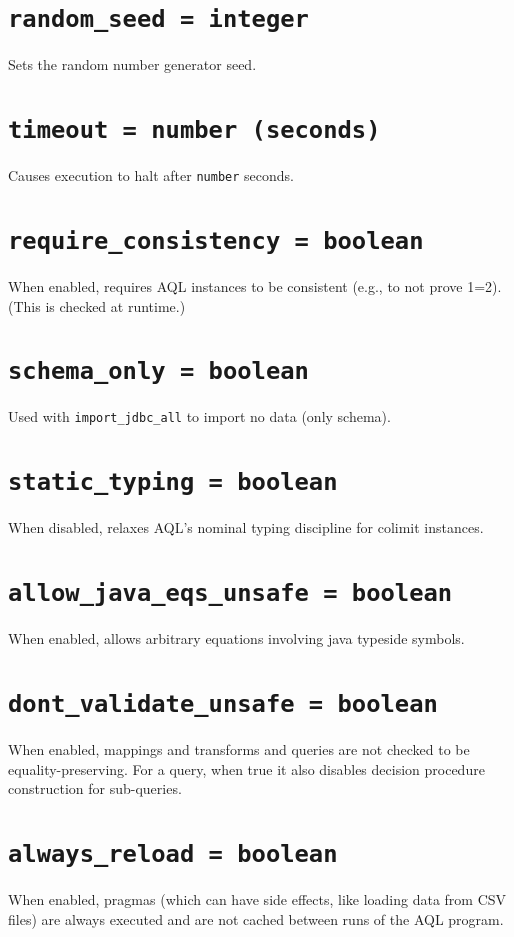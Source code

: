 \documentclass[10pt]{book}
\begin{document}
\section{{\tt random\_seed = integer}}
Sets the random number generator seed.

\section{{\tt timeout = number (seconds)}}
Causes execution to halt after {\tt number} seconds.

\section{{\tt require\_consistency = boolean}}
When enabled, requires AQL instances to be consistent (e.g., to not prove 1=2).  (This is checked at runtime.)

\section{{\tt schema\_only = boolean}}

Used with {\tt import\_jdbc\_all} to import no data (only schema).

\section{{\tt static\_typing = boolean}}
When disabled, relaxes AQL's nominal typing discipline for colimit instances.

\section{{\tt allow\_java\_eqs\_unsafe = boolean}}
When enabled, allows arbitrary equations involving java typeside symbols.

\section{{\tt dont\_validate\_unsafe = boolean}}
When enabled, mappings and transforms and queries are not checked to be equality-preserving.  For a query, when true it also disables decision procedure construction for sub-queries.

\section{{\tt always\_reload = boolean}}
When enabled, pragmas (which can have side effects, like loading data from CSV files) are always executed and are not cached between runs of the AQL program.
\end{document}
